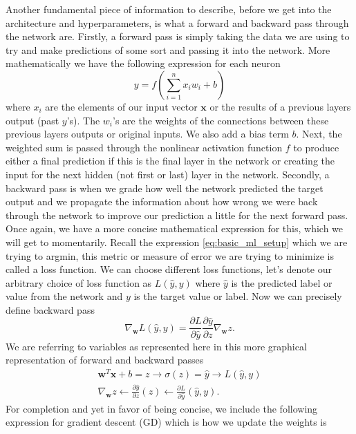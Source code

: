 \documentclass[11pt]{amsart}
\begin{document}
Another fundamental piece of information to describe, before we get into the architecture and hyperparameters, is what a forward and backward pass through the network are.
Firstly, a forward pass is simply taking the data we are using to try and make predictions of some sort and passing it into the network.
More mathematically we have the following expression for each neuron
\begin{equation}
y = f\left( \sum_{i=1}^n x_i w_i + b \right)
\label{eq:neuron_calc}
\end{equation}
where $x_i$ are the elements of our input vector $\bm x$  or the results of a previous layers output (past $y$'s).
The $w_i$'s are the weights of the connections between these previous layers outputs or original inputs.
We also add a bias term $b$.
Next, the weighted sum is passed through the nonlinear activation function $f$ to produce either a final prediction if this is the final layer in the network or creating the input for the next hidden (not first or last) layer in the network.
Secondly, a backward pass is when we grade how well the network predicted the target output and we propagate the information about how wrong we were back through the network to improve our prediction a little for the next forward pass.
Once again, we have a more concise mathematical expression for this, which we will get to momentarily.
Recall the expression \eqref{eq:basic_ml_setup} which we are trying to argmin, this metric or measure of error we are trying to minimize is called a loss function.
We can choose different loss functions, let's denote our arbitrary choice of loss function as $L(\hat y, y)$ where $\hat y$ is the predicted label or value from the network and $y$ is the target value or label.
Now we can precisely define backward pass
\begin{equation}
\nabla_{\bm w} L(\hat y, y) = \frac {\partial L}{\partial \hat y} \frac {\partial \hat y}{\partial z} \nabla_{\bm w} z.
\label{eq:back_prop}
\end{equation}
We are referring to variables as represented here in this more graphical representation of forward and backward passes
\begin{align*}
\boxed{\bm w^T \bm x + b = z} \rightarrow \boxed{\sigma(z) = \hat y} \rightarrow \boxed{L(\hat y , y)} \\
\boxed{\nabla_{\bm w} z} \leftarrow \boxed{\frac {\partial \hat y}{\partial z} (z)} \leftarrow \boxed{\frac {\partial L}{\partial \hat y}(\hat y , y)}.
\end{align*}
For completion and yet in favor of being concise, we include the following expression for gradient descent (GD) which is how we update the weights is
\end{document}
